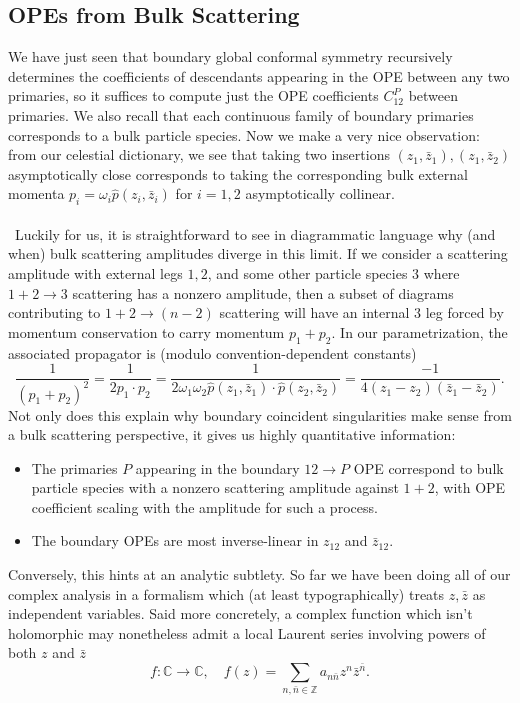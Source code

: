 \documentclass[11pt,letterpaper]{article}
\newcommand{\C}{\mathbb{C}}
\newcommand{\Z}{\mathbb{Z}}
\begin{document}
\subsection{OPEs from Bulk Scattering}
We have just seen that boundary global conformal symmetry recursively determines the coefficients of descendants appearing in the OPE between any two primaries, so it suffices to compute just the OPE coefficients $C_{12}^P$ between primaries. We also recall that each continuous family of boundary primaries corresponds to a bulk particle species. Now we make a very nice observation: from our celestial dictionary, we see that taking two insertions $(z_1, \bar{z}_1), (z_1, \bar{z}_2)$ asymptotically close corresponds to taking the corresponding bulk external momenta $p_i = \omega_i \hat{p}(z_i, \bar{z}_i)$ for $i=1,2$ asymptotically collinear. \\
\\
\
Luckily for us, it is straightforward to see in diagrammatic language why (and when) bulk scattering amplitudes diverge in this limit. If we consider a scattering amplitude with external legs $1,2$, and some other particle species $3$ where $1 + 2 \to 3$ scattering has a nonzero amplitude, then a subset of diagrams contributing to $1+2 \to (n-2)$ scattering will have an internal $3$ leg forced by momentum conservation to carry momentum $p_1 + p_2$. In our parametrization, the associated propagator is (modulo convention-dependent constants) \begin{equation}
\frac{1}{(p_1 + p_2)^2} = \frac{1}{2 p_1 \cdot p_2} = \frac{1}{2\omega_1 \omega_2 \hat{p}(z_1, \bar{z}_1) \cdot \hat{p}(z_2, \bar{z}_2)} = \frac{-1}{4 (z_1 - z_2)(\bar{z}_1 - \bar{z}_2)}.
\end{equation}
Not only does this explain why boundary coincident singularities make sense from a bulk scattering perspective, it gives us highly quantitative information: \begin{itemize}
\item The primaries $P$ appearing in the boundary $12 \to P$ OPE correspond to bulk particle species with a nonzero scattering amplitude against $1+2$, with OPE coefficient scaling with the amplitude for such a process.
\item The boundary OPEs are most inverse-linear in $z_{12}$ and $\bar{z}_{12}$.
\end{itemize}
Conversely, this hints at an analytic subtlety. So far we have been doing all of our complex analysis in a formalism which (at least typographically) treats $z, \bar{z}$ as independent variables. Said more concretely, a complex function which isn't holomorphic may nonetheless admit a local Laurent series involving powers of both $z$ and $\bar{z}$ \begin{equation}
f: \C \to \C, \quad f(z) = \sum_{n, \bar{n} \in \Z} a_{n \bar{n}} z^n \bar{z}^{\bar{n}}.
\end{equation}
\end{document}
